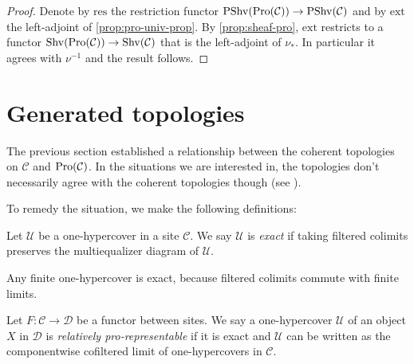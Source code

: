 \begin{proof}
    Denote by $\mathrm{res}$ the restriction functor
    $\mathrm{PShv}(\mathrm{Pro}(\mathcal{C})) \to \mathrm{PShv}(\mathcal{C})$ and by
    $\mathrm{ext}$ the left-adjoint of \ref{prop:pro-univ-prop}. By \ref{prop:sheaf-pro},
    $\mathrm{ext}$ restricts to a functor $\mathrm{Shv}(\mathrm{Pro}(\mathcal{C})) \to \mathrm{Shv}(\mathcal{C})$
    that is the left-adjoint of $\nu_*$. In particular it agrees with $\nu^{-1}$ and
    the result follows.
\end{proof}

\section{Generated topologies}

The previous section established a relationship between the coherent topologies on $\mathcal{C}$ and
$\mathrm{Pro}(\mathcal{C})$. In the situations we are interested in, the topologies don't necessarily agree
with the coherent topologies though (see ).

To remedy the situation, we make the following definitions:

\begin{definition}
    Let $\mathcal{U}$ be a one-hypercover in a site $\mathcal{C}$. We say
    $\mathcal{U}$ is \emph{exact} if taking filtered colimits
    preserves the multiequalizer diagram of $\mathcal{U}$.
\end{definition}

\begin{example}
    Any finite one-hypercover is exact, because filtered colimits commute
    with finite limits.
\end{example}

\begin{definition}
    Let $F\colon \mathcal{C} \to \mathcal{D}$ be a functor between sites. We say
    a one-hypercover $\mathcal{U}$ of an object $X$ in $\mathcal{D}$ is
    \emph{relatively pro-representable} if it is exact and $\mathcal{U}$ can be written
    as the componentwise cofiltered limit of one-hypercovers in $\mathcal{C}$.
    \label{def:one-cover-relatively-pro-prepresentable}
    \leanok
\end{definition}

